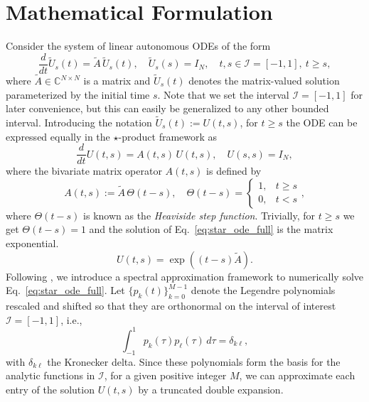 \documentclass[final,1p,times,number]{elsarticle}
\theoremstyle{plain}%
\begin{document}
\section{Mathematical Formulation} \label{sec2}
Consider the system of linear autonomous ODEs of the form
\begin{equation}\label{eq:matrix_ode_full}
\frac{d}{dt} \tilde{U}_s(t) = \tilde{A} \, \tilde{U}_s(t), \quad \tilde{U}_s(s) = I_N, \quad t, s \in \mathcal{I} = [-1, 1], \ t \ge s,
\end{equation}
where \(\tilde{A} \in \mathbb{C}^{N \times N}\) is a matrix and \(\tilde{U}_s(t)\) denotes the matrix-valued solution parameterized by the initial time \(s\). Note that we set the interval $\mathcal{I}=[-1,1]$ for later convenience, but this can easily be generalized to any other bounded interval. 
Introducing the notation \(\tilde{U}_s(t) := U(t,s)\), for $t\geq s$ the ODE can be expressed equally in the \(\star\)-product framework \cite{pozza2023newk,GiscardPozza,Pozzxa} as
\begin{equation}\label{eq:star_ode_full}
\frac{d}{dt} U(t,s) = A(t,s) \, U(t,s), \quad U(s,s) = I_N,
\end{equation}
where the bivariate matrix operator \(A(t,s)\) is defined by
\begin{equation} \label{heaviside}
A(t,s) := \tilde{A} \, \Theta(t-s), \quad 
\Theta(t-s) = \begin{cases} 1, & t \ge s \\ 0, & t < s \end{cases},
\end{equation}
where $\Theta(t-s)$ is known as the \emph{Heaviside step function}.
Trivially, for \(t \ge s\) we get \(\Theta(t-s) = 1\) and the solution of Eq.~\eqref{eq:star_ode_full} is the matrix exponential.
\begin{equation*}
U(t,s) = \exp\left((t-s) \tilde{A}\right).
\end{equation*}
Following \cite{pozza2023newk}, we introduce a spectral approximation framework to numerically solve Eq.~\eqref{eq:star_ode_full}.  
Let $\{p_k(t)\}_{k=0}^{M-1}$ denote the Legendre polynomials rescaled and shifted so that they are orthonormal on the interval of interest $\mathcal I=[-1,1]$, i.e.,
\[
\int_{-1}^1 p_k(\tau)p_\ell(\tau)\,d\tau=\delta_{k\ell},
\]
with $\delta_{k\ell}$ the Kronecker delta.
Since these polynomials form the basis for the analytic functions in $\mathcal I$, for a given positive integer $M$, we can approximate each entry of the solution $U(t,s)$ by a truncated double expansion.
\end{document}
